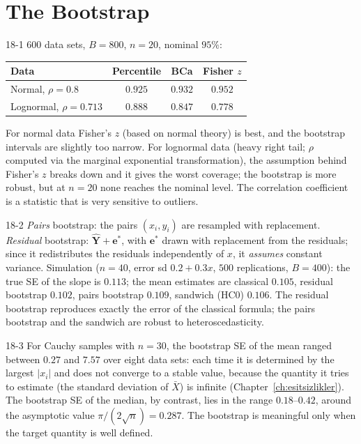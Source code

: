 \section{The Bootstrap}

\begin{solution}{18-1}
$600$ data sets, $B=800$, $n=20$, nominal $95\%$:
\begin{center}\small
\begin{tabular}{@{}lccc@{}}\toprule
Data & Percentile & BCa & Fisher $z$\\\midrule
Normal, $\rho=0.8$ & $0.925$ & $0.932$ & $0.952$\\
Lognormal, $\rho=0.713$ & $0.888$ & $0.847$ & $0.778$\\\bottomrule
\end{tabular}
\end{center}
For normal data Fisher's $z$ (based on normal theory) is best, and the bootstrap intervals are slightly too narrow. For lognormal data (heavy right tail; $\rho$ computed via the marginal exponential transformation), the assumption behind Fisher's $z$ breaks down and it gives the worst coverage; the bootstrap is more robust, but at $n=20$ none reaches the nominal level. The correlation coefficient is a statistic that is very sensitive to outliers.
\end{solution}

\begin{solution}{18-2}
\emph{Pairs} bootstrap: the pairs $(x_i,y_i)$ are resampled with replacement. \emph{Residual} bootstrap: $\hat{\mathbf Y}+\mathbf e^*$, with $\mathbf e^*$ drawn with replacement from the residuals; since it redistributes the residuals independently of $x$, it \emph{assumes} constant variance. Simulation ($n=40$, error sd $0.2+0.3x$, $500$ replications, $B=400$): the true SE of the slope is $0.113$; the mean estimates are classical $0.105$, residual bootstrap $0.102$, pairs bootstrap $0.109$, sandwich (HC0) $0.106$. The residual bootstrap reproduces exactly the error of the classical formula; the pairs bootstrap and the sandwich are robust to heteroscedasticity.
\end{solution}

\begin{solution}{18-3}
For Cauchy samples with $n=30$, the bootstrap SE of the mean ranged between $0.27$ and $7.57$ over eight data sets: each time it is determined by the largest $|x_i|$ and does not converge to a stable value, because the quantity it tries to estimate (the standard deviation of $\bar X$) is infinite (Chapter~\ref{ch:esitsizlikler}). The bootstrap SE of the median, by contrast, lies in the range $0.18$--$0.42$, around the asymptotic value $\pi/(2\sqrt n)=0.287$. The bootstrap is meaningful only when the target quantity is well defined.
\end{solution}

